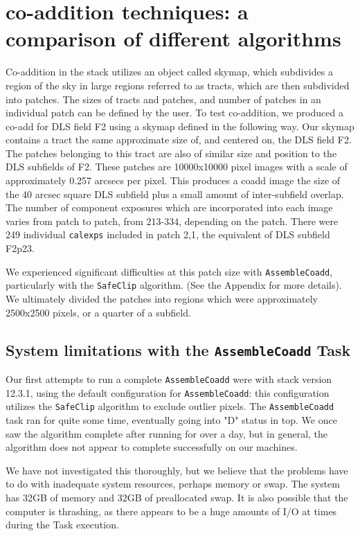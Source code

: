 \documentclass[modern]{aastex61}
\begin{document}
\section{co-addition techniques: a comparison of different algorithms}
Co-addition in the stack utilizes an object called skymap, which subdivides a region of the sky in large regions referred to as tracts, which are then subdivided into patches. The sizes of tracts and patches, and number of patches in an individual patch can be defined by the user. To test co-addition, we produced a co-add for DLS field F2 using a skymap defined in the following way. Our skymap contains a tract the same approximate size of, and centered on, the DLS field F2. The patches belonging to this tract are also of similar size and position to the DLS subfields of F2. These patches are 10000x10000 pixel images with a scale of approximately 0.257 arcsecs per pixel. This produces a coadd image the size of the 40 arcsec square DLS subfield plus a small amount of inter-subfield overlap. The number of component exposures which are incorporated into each image varies from patch to patch, from 213-334, depending on the patch. There were 249 individual {\tt\string calexps} included in patch 2,1, the equivalent of DLS subfield F2p23.

We experienced significant difficulties at this patch size with {\tt\string AssembleCoadd}, particularly with the {\tt\string SafeClip} algorithm. (See the Appendix for more details). We ultimately divided the patches into regions which were approximately 2500x2500 pixels, or a quarter of a subfield.
\subsection{System limitations with the {\tt\string AssembleCoadd} Task}
Our first attempts to run a complete {\tt\string AssembleCoadd} were with stack version 12.3.1, using the default configuration for {\tt\string AssembleCoadd}: this configuration utilizes the {\tt\string SafeClip} algorithm to exclude outlier pixels. The {\tt\string AssembleCoadd} task ran for quite some time, eventually going into "D" status in top. We once saw the algorithm complete after running for over a day, but in general, the algorithm does not appear to complete successfully on our machines.

We have not investigated this thoroughly, but we believe that the problems have to do with inadequate system resources, perhaps memory or swap. The system has 32GB of memory and 32GB of preallocated swap.  It is also possible that the computer is thrashing, as there appears to be a huge amounts of I/O at times during the Task execution.
\end{document}
